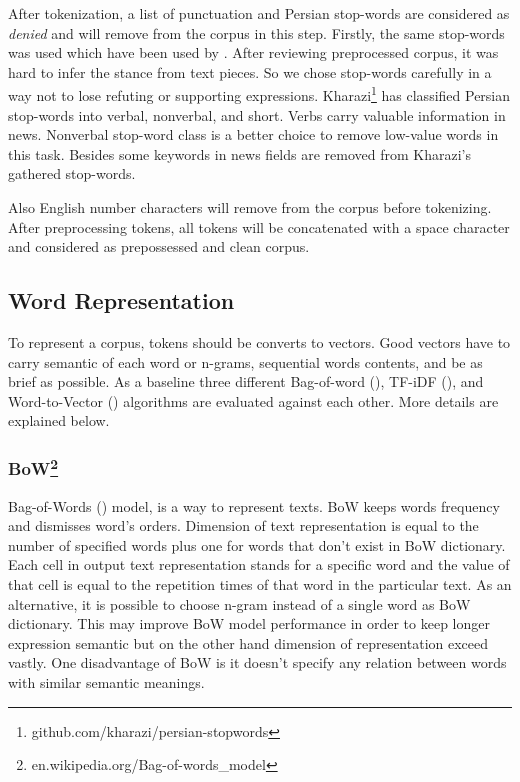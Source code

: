 After tokenization, a list of punctuation and Persian stop-words are considered as \textit{denied} and will remove from the corpus in this step. Firstly, the same stop-words was used which have been used by \cite{stance_persian}. After reviewing preprocessed corpus, it was hard to infer the stance from text pieces. So we chose stop-words carefully in a way not to lose refuting or supporting expressions. Kharazi\footnote{\label{fn:kharazi}github.com/kharazi/persian-stopwords} has classified Persian stop-words into verbal, nonverbal, and short. Verbs carry valuable information in news. Nonverbal stop-word class is a better choice to remove low-value words in this task. Besides some keywords in news fields are removed from Kharazi's gathered stop-words. 

Also English number characters will remove from the corpus before tokenizing. After preprocessing tokens, all tokens will be concatenated with a space character and considered as prepossessed and clean corpus.


\subsection{Word Representation}
To represent a corpus, tokens should be converts to vectors. Good vectors have to carry semantic of each word or n-grams, sequential words contents, and be as brief as possible. As a baseline three different Bag-of-word (\cite{bow}), TF-iDF (\cite{tfidf}), and Word-to-Vector (\cite{word2vec}) algorithms are evaluated against each other. More details are explained below.

\subsubsection{BoW\protect\footnote{en.wikipedia.org/Bag-of-words\_model}}
Bag-of-Words (\cite{bow}) model, is a way to represent texts. BoW keeps words frequency and
dismisses word's orders. Dimension of text representation is equal to the number of specified words plus one for words that don't exist in BoW dictionary. Each cell in output text representation stands for a specific word and the value of that cell is equal to the repetition times of that word in the particular text. As an alternative, it is possible to choose n-gram instead of a single word as BoW dictionary. This may improve BoW model performance in order to keep longer expression semantic but on the other hand dimension of representation exceed vastly. One disadvantage of BoW is it doesn't specify any relation between words with similar semantic meanings. 

